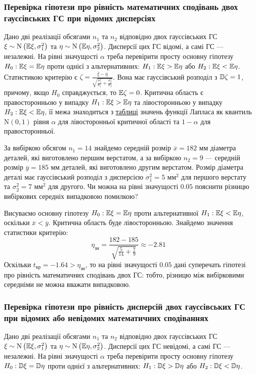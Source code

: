 \subsubsection*{Перевірка гіпотези про рівність математичних сподівань двох гауссівських 
ГС при відомих дисперсіях}
Дано дві реалізації обсягами $n_1$ та $n_2$ відповідно двох гауссівських ГС
$\xi \sim \mathrm{N}\left(\mathbb{E} \xi, \sigma_1^2\right)$ та $\eta \sim \mathrm{N}\left(\mathbb{E} \eta, \sigma_2^2\right)$.
Дисперсії цих ГС відомі, а самі ГС --- незалежні. На рівні значущості $\alpha$ треба перевірити
просту основну гіпотезу $H_0: \mathbb{E} \xi = \mathbb{E}\eta$ проти однієї з альтернативних:
$H_1 : \mathbb{E}\xi > \mathbb{E}\eta$ або $H_2 : \mathbb{E}\xi < \mathbb{E}\eta$. Статистикою критерію є
$\zeta = \frac{\overline{\xi} - \overline{\eta}}{\sqrt{\frac{\sigma_1^2}{n_1} + \frac{\sigma_2^2}{n_2}}}$. Вона має
гауссівський розподіл з $\mathbb{D}\zeta = 1$, причому, якщо $H_0$ справджується, то $\mathbb{E}\zeta = 0$.
Критична область є правосторонньою у випадку $H_1: \mathbb{E}\xi > \mathbb{E}\eta$ та лівосторонньою у випадку $H_2: \mathbb{E}\xi < \mathbb{E}\eta$,
її межа знаходиться з \hyperref[table:laplace]{таблиці} значень функції Лапласа як квантиль $\mathrm{N}(0, 1)$ рівня $\alpha$ для лівосторонньої
критичної області та $1-\alpha$ для правосторонньої.
\begin{example}
    За вибіркою обсягом $n_1 = 14$ знайдемо середній розмір $\overline{x} = 182$ мм діаметра деталей,
    які виготовлено першим верстатом, а за вибіркою $n_2 = 9$ --- середній розмір
    $\overline{y} = 185$ мм деталей, які виготовлено другим верстатом. Розмір діаметра деталі
    має гауссівський розподіл з дисперсією $\sigma_1^2 = 5$ мм$^2$ для першого верстату
    та $\sigma_2^2 = 7$ мм$^2$ для другого. Чи можна на рівні значущості $0.05$ пояснити різницю вибіркових середніх
    випадковою помилкою?

    Висуваємо основну гіпотезу $H_0 : \mathbb{E} \xi = \mathbb{E}\eta$ проти альтернативної
    $H_1 : \mathbb{E}\xi < \mathbb{E}\eta$, оскільки $\overline{x} < \overline{y}$. Критична область буде лівосторонньою.
    Знайдемо значення статистики критерію:
    $$
    \eta_{\text{зн}} = \frac{182 - 185}{\sqrt{\frac{5}{14} + \frac{7}{9}}} \approx -2.81
    $$
    Оскільки $t_{\text{кр}} = -1.64 > \eta_{\text{зн}}$, то на рівні значущості $0.05$ дані суперечать гіпотезі
    про рівність математичних сподівань двох ГС: тобто, різницю між вибірковими середніми не можна вважати випадковою.
\end{example}

\subsubsection*{Перевірка гіпотези про рівність дисперсій двох гауссівських 
ГС при відомих або невідомих математичних сподіваннях}
Дано дві реалізації обсягами $n_1$ та $n_2$ відповідно двох гауссівських ГС
$\xi \sim \mathrm{N}\left(\mathbb{E} \xi, \sigma_1^2\right)$ та $\eta \sim \mathrm{N}\left(\mathbb{E} \eta, \sigma_2^2\right)$.
Дисперсії цих ГС невідомі, а самі ГС --- незалежні. На рівні значущості $\alpha$ треба перевірити
просту основну гіпотезу $H_0: \mathbb{D} \xi = \mathbb{D} \eta$ проти однієї з альтернативних:
$H_1 : \mathbb{D}\xi > \mathbb{D}\eta$ або $H_2 : \mathbb{D}\xi < \mathbb{D}\eta$. 


